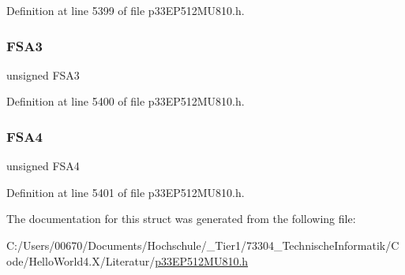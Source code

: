 Definition at line 5399 of file p33\+E\+P512\+M\+U810.\+h.

\mbox{\label{structtag_c2_f_c_t_r_l_b_i_t_s_a20bcf2bebd5be6be1a31fce2812487f1}} 
\subsubsection{\texorpdfstring{F\+S\+A3}{FSA3}}
{\footnotesize\ttfamily unsigned F\+S\+A3}



Definition at line 5400 of file p33\+E\+P512\+M\+U810.\+h.

\mbox{\label{structtag_c2_f_c_t_r_l_b_i_t_s_a612519942ed2303c487fcdfcac0d4efc}} 
\subsubsection{\texorpdfstring{F\+S\+A4}{FSA4}}
{\footnotesize\ttfamily unsigned F\+S\+A4}



Definition at line 5401 of file p33\+E\+P512\+M\+U810.\+h.



The documentation for this struct was generated from the following file\+:\begin{DoxyCompactItemize}
\item 
C\+:/\+Users/00670/\+Documents/\+Hochschule/\+\_\+\+Tier1/73304\+\_\+\+Technische\+Informatik/\+Code/\+Hello\+World4.\+X/\+Literatur/\hyperlink{p33_e_p512_m_u810_8h}{p33\+E\+P512\+M\+U810.\+h}\end{DoxyCompactItemize}
